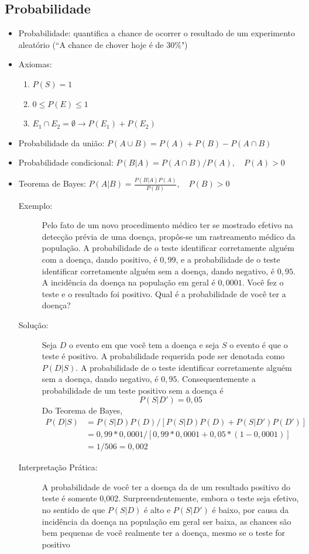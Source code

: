 \subsection{Probabilidade}
\begin{itemize}
	\item Probabilidade: quantifica a chance de ocorrer o resultado de um experimento aleatório (“A chance de chover hoje é de 30\%")
	\item Axiomas:
	\begin{enumerate}
		\item $P(S)=1$
		\item $0\leq P(E)\leq 1$
		\item $E_1\cap E_2=\emptyset\to P(E_1)+P(E_2)$
	\end{enumerate}
	\item Probabilidade da união: $P(A\cup B)=P(A)+P(B)-P(A\cap B)$
	\item Probabilidade condicional: $P(B|A)=P(A\cap B)/P(A),\quad P(A)>0$
	\item Teorema de Bayes:  $P(A|B)=\frac{P(B|A)P(A)}{P(B)},\quad P(B)>0$\\ %
	\begin{description}
		\item[Exemplo:] Pelo fato de um novo procedimento médico ter se mostrado efetivo na detecção prévia de uma doença, propôs-se um rastreamento médico da população. A probabilidade de o teste identificar corretamente alguém com a doença, dando positivo, é $0,99$, e a probabilidade de o teste identificar corretamente alguém sem a doença, dando negativo, é $0,95$. A incidência da doença na população em geral é $0,0001$. Você fez o teste e o resultado foi positivo. Qual é a probabilidade de você ter a doença?
		\item[Solução:] Seja $D$ o evento em que você tem a doença e seja $S$ o evento é que o teste é positivo. A probabilidade requerida pode ser denotada como $P(D|S)$. A probabilidade de o teste identificar corretamente alguém sem a doença, dando negativo, é $0,95$. Consequentemente a probabilidade de um teste positivo sem a doença é
		$$P(S|D') = 0,05$$
		Do Teorema de Bayes,
		\begin{align*}
			P(D|S)&=P(S|D)P(D)/[P(S|D)P(D)+P(S|D')P(D')]\\
			&=0,99*0,0001/[0,99*0,0001+0,05*(1-0,0001)]\\
			&=1/506=0,002
		\end{align*}
		\item[Interpretação Prática:] A probabilidade de você ter a doença da de um resultado positivo do teste é somente 0,002. Surpreendentemente, embora o teste seja efetivo, no sentido de que $P(S|D)$ é alto e $P(S|D')$ é baixo, por causa da incidência da doença na população em geral ser baixa, as chances são bem pequenas de você realmente ter a doença, mesmo se o teste for positivo
	\end{description}
\end{itemize}


